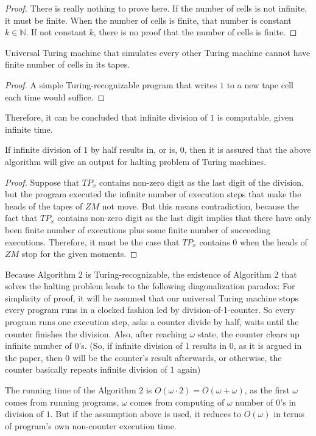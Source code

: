 \documentclass{roffin}
\begin{document}
\begin{proof}
There is really nothing to prove here. If the number of cells is not infinite, it must be finite. When the number of cells is finite, that number is constant $k \in \mathbb{N}$. If not constant $k$, there is no proof that the number of cells is finite.
\end{proof}
\begin{proposition}
Universal Turing machine that simulates every other Turing machine cannot have finite number of cells in its tapes. 
\end{proposition}
\begin{proof}
A simple Turing-recognizable program that writes $1$ to a new tape cell each time would suffice. 
\end{proof}
Therefore, it can be concluded that infinite division of $1$ is computable, given infinite time. 
\begin{proposition}
If infinite division of $1$ by half results in, or is, $0$, then it is assured that the above algorithm will give an output for halting problem of Turing machines. 
\end{proposition}
\begin{proof}
Suppose that $TP_x$ contains non-zero digit as the last digit of the division, but the program executed the infinite number of execution steps that make the heads of the tapes of $ZM$ not move. But this means contradiction, because the fact that $TP_x$ contains non-zero digit as the last digit implies that there have only been finite number of executions plus some finite number of succeeding executions. Therefore, it must be the case that $TP_x$ contains $0$ when the heads of $ZM$ stop for the given moments.
\end{proof}
Because Algorithm 2 is Turing-recognizable, the existence of Algorithm 2 that solves the halting problem leads to the following diagonalization paradox:
For simplicity of proof, it will be assumed that our universal Turing machine stops every program runs in a clocked fashion led by division-of-1-counter. So every program runs one execution step, asks a counter divide by half, waits until the counter finishes the division. Also, after reaching $\omega$ state, the counter clears up infinite number of $0$'s. (So, if infinite division of $1$ results in $0$, as it is argued in the paper, then $0$ will be the counter's result afterwards, or otherwise, the counter basically repeats infinite division of $1$ again)
\begin{lemma}
The running time of the Algorithm 2 is $O(\omega \cdot 2) = O(\omega + \omega)$, as the first $\omega$ comes from running programs, $\omega$ comes from computing of $\omega$ number of $0$'s in division of $1$. But if the assumption above is used, it reduces to $O(\omega)$ in terms of program's own non-counter execution time.
\end{lemma}
\end{document}
